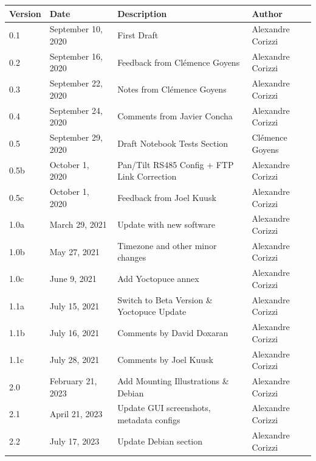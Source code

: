 \documentclass[a4paper,11pt,notitlepage]{article}
\begin{document}
\begin{tabularx}{\textwidth}{|l|l|X|l|}
\hline
\textbf{Version} & \textbf{Date}     & \textbf{Description} & \textbf{Author} \\ \hline
            0.1  & September 10, 2020     & First Draft & Alexandre Corizzi   \\ \hline
            0.2  & September 16, 2020     & Feedback from Clémence Goyens & 
			Alexandre Corizzi \\ \hline
            0.3  & September 22, 2020     & Notes from Clémence Goyens    
			& Alexandre Corizzi \\ \hline
            0.4  & September 24, 2020     & Comments from Javier Concha 
			& Alexandre Corizzi \\ \hline
			0.5  & September 29, 2020     & Draft Notebook Tests Section
			& Clémence Goyens \\ \hline
			0.5b  & October 1, 2020       &  Pan/Tilt RS485 Config + FTP Link 
			Correction & Alexandre Corizzi \\ \hline
			0.5c  & October 1, 2020       &  Feedback from Joel Kuusk
			& Alexandre Corizzi \\ \hline
			1.0a  & March 29, 2021   & Update with new software
			& Alexandre Corizzi \\ \hline
			1.0b  & May 27, 2021     & Timezone and other minor changes
			& Alexandre Corizzi \\ \hline
			1.0c  & June 9, 2021     & Add Yoctopuce annex
			& Alexandre Corizzi \\ \hline
			1.1a  & July 15, 2021    & Switch to Beta Version \& Yoctopuce Update
			& Alexandre Corizzi \\ \hline
			1.1b  & July 16, 2021    & Comments by David Doxaran  
			& Alexandre Corizzi \\ \hline
			1.1c  & July 28, 2021    & Comments by Joel Kuusk
			& Alexandre Corizzi \\ \hline
			2.0  & February 21, 2023    & Add Mounting Illustrations \& Debian
			& Alexandre Corizzi \\ \hline
			2.1  & April 21, 2023    & Update GUI screenshots, metadata configs
			& Alexandre Corizzi \\ \hline
			2.2  & July 17, 2023    & Update Debian section 
			& Alexandre Corizzi \\ \hline

\end{tabularx}
\newpage
\tableofcontents
\clearpage
\end{document}
